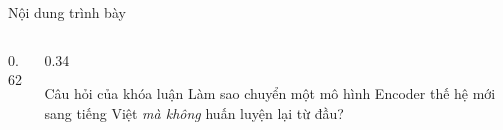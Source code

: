 \documentclass[aspectratio=169,10pt,t]{beamer}   %
\begin{document}
\begin{frame}{Nội dung trình bày}
  \vspace{0.6em}
  \begin{columns}[T]
    \begin{column}{0.62\textwidth}
      \tableofcontents[subsectionstyle=show/show]
    \end{column}
    \begin{column}{0.34\textwidth}
      \small
      \begin{block}{Câu hỏi của khóa luận}
        Làm sao chuyển một mô hình Encoder thế hệ mới sang tiếng Việt
        \emph{mà không} huấn luyện lại từ đầu?
      \end{block}
    \end{column}
  \end{columns}
\end{frame}







\end{document}
